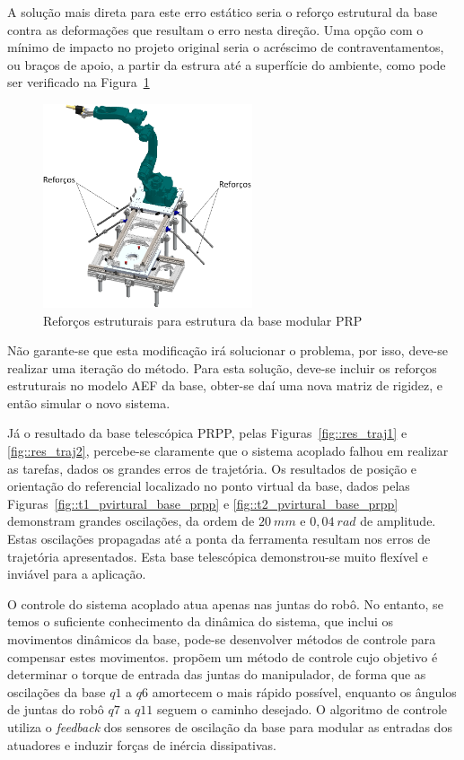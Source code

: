 A solução mais direta para este erro estático seria o reforço estrutural da base
contra as deformações que resultam o erro nesta direção. Uma opção com o mínimo
de impacto no projeto original seria o acréscimo de contraventamentos, ou braços
de apoio, a partir da estrura até a superfície do ambiente, como pode ser
verificado na Figura~\ref{fig::contraventamentos}

\begin{figure}[h!]
	\centering 
 	\includegraphics[width=0.55\textwidth]{figs/contraventamentos}
 	\caption{Reforços estruturais para estrutura da base modular PRP}
 	\label{fig::contraventamentos}
\end{figure}

Não garante-se que esta modificação irá solucionar o problema, por isso, deve-se
realizar uma iteração do método. Para esta solução, deve-se incluir os reforços
estruturais no modelo AEF da base, obter-se daí uma nova matriz de rigidez, e
então simular o novo sistema.

Já o resultado da base telescópica PRPP, pelas Figuras~\ref{fig::res_traj1} e
\ref{fig::res_traj2}, percebe-se claramente que o sistema acoplado falhou em
realizar as tarefas, dados os grandes erros de trajetória. Os resultados de
posição e orientação do referencial localizado no ponto virtual da base, dados
pelas Figuras~\ref{fig::t1_pvirtural_base_prpp} e
\ref{fig::t2_pvirtural_base_prpp} demonstram grandes oscilações, da ordem de
$20~mm$ e $0,04~rad$ de amplitude. Estas oscilações propagadas até a ponta da
ferramenta resultam nos erros de trajetória apresentados. Esta base telescópica
demonstrou-se muito flexível e inviável para a aplicação.

O controle do sistema acoplado atua apenas nas juntas do robô. No entanto, se
temos o suficiente conhecimento da dinâmica do sistema, que inclui os movimentos
dinâmicos da base, pode-se desenvolver métodos de controle para compensar estes
movimentos. \citet{lew2001simple} propõem um método de controle cujo objetivo é
determinar o torque de entrada das juntas do manipulador, de forma que as
oscilações da base $q1$ a $q6$ amortecem o mais rápido possível, enquanto os
ângulos de juntas do robô $q7$ a $q11$ seguem o caminho desejado. O algoritmo de
controle utiliza o \textit{feedback} dos sensores de oscilação da base para
modular as entradas dos atuadores e induzir forças de inércia dissipativas.

